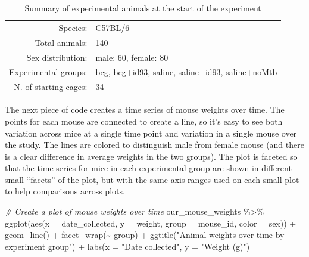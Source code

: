\documentclass[
]{book}
\newenvironment{Shaded}{\begin{snugshade}}{\end{snugshade}}
\newcommand{\AttributeTok}[1]{\textcolor[rgb]{0.77,0.63,0.00}{#1}}
\newcommand{\CommentTok}[1]{\textcolor[rgb]{0.56,0.35,0.01}{\textit{#1}}}
\newcommand{\FunctionTok}[1]{\textcolor[rgb]{0.00,0.00,0.00}{#1}}
\newcommand{\NormalTok}[1]{#1}
\newcommand{\SpecialCharTok}[1]{\textcolor[rgb]{0.00,0.00,0.00}{#1}}
\newcommand{\StringTok}[1]{\textcolor[rgb]{0.31,0.60,0.02}{#1}}
\begin{document}
\begin{table}

\caption{\label{tab:unnamed-chunk-14}Summary of experimental animals at the start of the experiment}
\centering
\begin{tabular}[t]{r|l}
\hline
 & \\
\hline
Species: & C57BL/6\\
\hline
Total animals: & 140\\
\hline
Sex distribution: & male: 60, female: 80\\
\hline
Experimental groups: & bcg, bcg+id93, saline, saline+id93, saline+noMtb\\
\hline
N. of starting cages: & 34\\
\hline
\end{tabular}
\end{table}

The next piece of code creates a time series of mouse weights over time. The points
for each mouse are connected to create a line, so it's easy to see both variation
across mice at a single time point and variation in a single mouse over the study.
The lines are colored to distinguish male from female mouse (and there is a clear
difference in average weights in the two groups). The plot is faceted so that the
time series for mice in each experimental group are shown in different small
``facets'' of the plot, but with the same axis ranges used on each small plot to
help comparisons across plots.

\begin{Shaded}
\begin{Highlighting}[]
\CommentTok{\# Create a plot of mouse weights over time}
\NormalTok{our\_mouse\_weights }\SpecialCharTok{\%\textgreater{}\%} 
  \FunctionTok{ggplot}\NormalTok{(}\FunctionTok{aes}\NormalTok{(}\AttributeTok{x =}\NormalTok{ date\_collected, }\AttributeTok{y =}\NormalTok{ weight, }
             \AttributeTok{group =}\NormalTok{ mouse\_id, }\AttributeTok{color =}\NormalTok{ sex)) }\SpecialCharTok{+} 
  \FunctionTok{geom\_line}\NormalTok{() }\SpecialCharTok{+} 
  \FunctionTok{facet\_wrap}\NormalTok{(}\SpecialCharTok{\textasciitilde{}}\NormalTok{ group) }\SpecialCharTok{+} 
  \FunctionTok{ggtitle}\NormalTok{(}\StringTok{"Animal weights over time by experiment group"}\NormalTok{) }\SpecialCharTok{+}
  \FunctionTok{labs}\NormalTok{(}\AttributeTok{x =} \StringTok{"Date collected"}\NormalTok{, }
       \AttributeTok{y =} \StringTok{"Weight (g)"}\NormalTok{)}
\end{Highlighting}
\end{Shaded}
\end{document}
